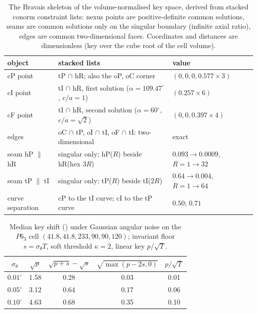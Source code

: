 \documentclass[preprint,pdf]{iucr}          %
\newcommand{\Ang}{\text{\AA}}
\begin{document}
\begin{table}
\caption{The Bravais skeleton of the volume-normalised key space, derived from stacked conorm constraint lists: nexus points are positive-definite common solutions, seams are common solutions only on the singular boundary (infinite axial ratio), edges are common two-dimensional faces. Coordinates and distances are dimensionless (key over the cube root of the cell volume).}
\label{tab:nexus}
\begin{footnotesize}\begin{tabular}{lll}
object & stacked lists & value \\
\hline
cP point & tP $\cap$ hR; also the oP, oC corner & $(0,0,0,0.577{\times}3)$ \\
cI point & tI $\cap$ hR, first solution ($\alpha{=}109.47^\circ$, $c/a{=}1$) & $(0.257{\times}6)$ \\
cF point & tI $\cap$ hR, second solution ($\alpha{=}60^\circ$, $c/a{=}\sqrt2$) & $(0,0,0.397{\times}4)$ \\
edges & oC $\cap$ tP, oI $\cap$ tI, oF $\cap$ tI: two-dimensional & exact \\
seam hP $\parallel$ hR & singular only; hP($R$) beside hR(hex $3R$) & $0.093\to0.0009$, $R{=}1\to32$ \\
seam tP $\parallel$ tI & singular only; tP($R$) beside tI($2R$) & $0.64\to0.004$, $R{=}1\to64$ \\
curve separation & cP to the tI curve; cI to the tP curve & $0.50$; $0.71$ \\
\end{tabular}\end{footnotesize}
\end{table}

\begin{table}
\caption{Median key shift (\Ang) under Gaussian angular noise on the $P6_3$ cell $(41.8,41.8,233,90,90,120)$; invariant floor $s=\sigma_\theta T$, soft threshold $\kappa=2$, linear key $p/\sqrt T$.}
\label{tab:noise}
\begin{tabular}{ccccc}
$\sigma_\theta$ & $\sqrt p$ & $\sqrt{p+s}-\sqrt s$ & $\sqrt{\max(p-2s,0)}$ & $p/\sqrt T$ \\
\hline
$0.01^\circ$ & 1.58 & 0.28 & 0.03 & 0.01 \\
$0.05^\circ$ & 3.12 & 0.64 & 0.17 & 0.06 \\
$0.10^\circ$ & 4.63 & 0.68 & 0.35 & 0.10 \\
\end{tabular}
\end{table}
\end{document}
